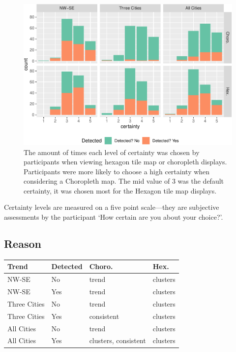 \documentclass[conference,final,]{IEEEtran}
\makeatletter
\def\maxwidth{\ifdim\Gin@nat@width>\linewidth\linewidth
\else\Gin@nat@width\fi}
\let\Oldincludegraphics\includegraphics
\renewcommand{\includegraphics}[1]{\Oldincludegraphics[width=\maxwidth]{#1}}
\makeatother
\begin{document}
\begin{figure}
\centering
\includegraphics{paper_files/figure-latex/certainty-1.pdf}
\caption{The amount of times each level of certainty was chosen by
participants when viewing hexagon tile map or choropleth displays.
Participants were more likely to choose a high certainty when
considering a Choropleth map. The mid value of 3 was the default
certainty, it was chosen most for the Hexagon tile map displays.}
\end{figure}

Certainty levels are measured on a five point scale---they are
subjective assessments by the participant `How certain are you about
your choice?'.

\hypertarget{reason}{%
\subsection{Reason}\label{reason}}

\begin{table}[H]
\centering
\begin{tabular}{llll}
\toprule
Trend & Detected & Choro. & Hex.\\
\midrule
NW-SE & No & trend & clusters\\
NW-SE & Yes & trend & clusters\\
Three Cities & No & trend & clusters\\
Three Cities & Yes & consistent & clusters\\
All Cities & No & trend & clusters\\
\addlinespace
All Cities & Yes & clusters, consistent & clusters\\
\bottomrule
\end{tabular}
\end{table}
\end{document}
